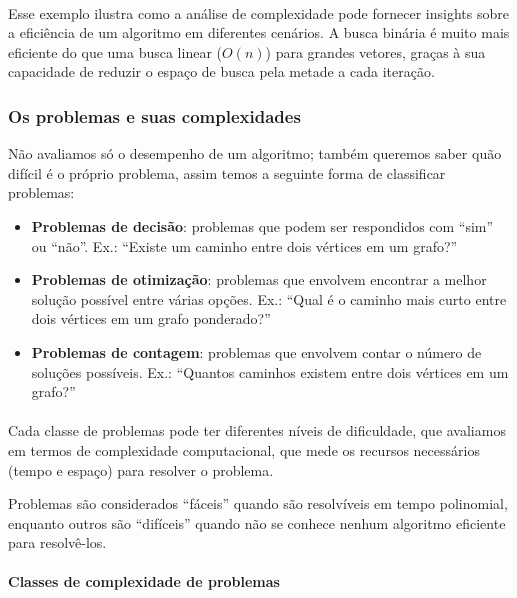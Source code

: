 \documentclass[12pt,a4paper]{article}
\def\emph#1{#1}%
\begin{document}
\paragraph{}
Esse exemplo ilustra como a análise de complexidade pode fornecer insights sobre a eficiência de um algoritmo em diferentes cenários. A busca binária é muito mais eficiente do que uma busca linear (\(O(n)\)) para grandes vetores, graças à sua capacidade de reduzir o espaço de busca pela metade a cada iteração.

\subsubsection{Os problemas e suas complexidades}

Não avaliamos só o desempenho de \emph{um algoritmo}; também queremos saber \emph{quão difícil é o próprio problema}, assim temos  a seguinte forma de classificar problemas:
\begin{itemize}\setlength{\itemsep}{2pt}
    \item \textbf{Problemas de decisão}: problemas que podem ser respondidos com ``sim'' ou ``não''. Ex.: ``Existe um caminho entre dois vértices em um grafo?''
    \item \textbf{Problemas de otimização}: problemas que envolvem encontrar a melhor solução possível entre várias opções. Ex.: ``Qual é o caminho mais curto entre dois vértices em um grafo ponderado?''
    \item \textbf{Problemas de contagem}: problemas que envolvem contar o número de soluções possíveis. Ex.: ``Quantos caminhos existem entre dois vértices em um grafo?''
\end{itemize}

\paragraph{}
Cada classe de problemas pode ter diferentes níveis de dificuldade, que avaliamos em termos de \emph{complexidade computacional}, que mede os recursos necessários (tempo e espaço) para resolver o problema.

Problemas são considerados ``fáceis'' quando são resolvíveis em tempo polinomial, enquanto outros são ``difíceis'' quando não se conhece nenhum algoritmo eficiente para resolvê-los.

\paragraph{Classes de complexidade de problemas}
\end{document}
